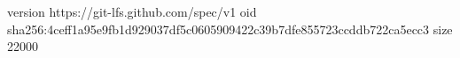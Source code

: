 version https://git-lfs.github.com/spec/v1
oid sha256:4ceff1a95e9fb1d929037df5c0605909422c39b7dfe855723ccddb722ca5ecc3
size 22000
